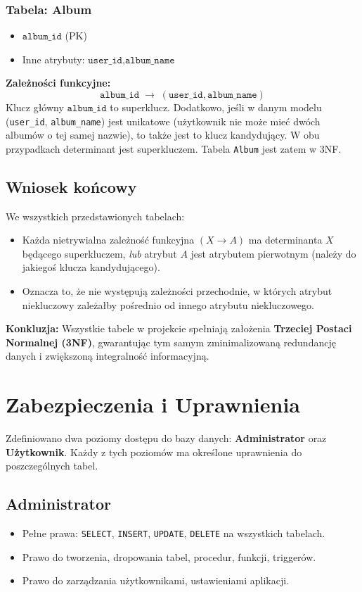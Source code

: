 \documentclass[12pt,a4paper]{article}
\begin{document}
\subsubsection{Tabela: Album}
\begin{itemize}
    \item \(\texttt{album\_id}\) (PK)
    \item Inne atrybuty: \(\texttt{user\_id}, \texttt{album\_name}\)
\end{itemize}

\noindent \textbf{Zależności funkcyjne:}
\[
\texttt{album\_id} \;\rightarrow\; (\texttt{user\_id}, \texttt{album\_name})
\]
Klucz główny \(\texttt{album\_id}\) to superklucz. Dodatkowo, jeśli w danym modelu (\texttt{user\_id}, \texttt{album\_name}) jest unikatowe (użytkownik nie może mieć dwóch albumów o tej samej nazwie), to także jest to klucz kandydujący. W obu przypadkach determinant jest superkluczem. Tabela \texttt{Album} jest zatem w 3NF.

\subsection{Wniosek końcowy}
We wszystkich przedstawionych tabelach:
\begin{itemize}
    \item Każda nietrywialna zależność funkcyjna \((X \rightarrow A)\) ma determinanta \(X\) będącego superkluczem, \emph{lub} atrybut \(A\) jest atrybutem pierwotnym (należy do jakiegoś klucza kandydującego).
    \item Oznacza to, że nie występują zależności przechodnie, w których atrybut niekluczowy zależałby pośrednio od innego atrybutu niekluczowego.
\end{itemize}

\noindent \textbf{Konkluzja:} Wszystkie tabele w projekcie spełniają założenia \textbf{Trzeciej Postaci Normalnej (3NF)}, gwarantując tym samym zminimalizowaną redundancję danych i zwiększoną integralność informacyjną.

\section{Zabezpieczenia i Uprawnienia}
Zdefiniowano dwa poziomy dostępu do bazy danych: \textbf{Administrator} oraz \textbf{Użytkownik}. Każdy z tych poziomów ma określone uprawnienia do poszczególnych tabel.
\subsection{Administrator}
\begin{itemize}
    \item Pełne prawa: \texttt{SELECT}, \texttt{INSERT}, \texttt{UPDATE}, \texttt{DELETE} na wszystkich tabelach.
    \item Prawo do tworzenia, dropowania tabel, procedur, funkcji, triggerów.
    \item Prawo do zarządzania użytkownikami, ustawieniami aplikacji.
\end{itemize}
\end{document}
